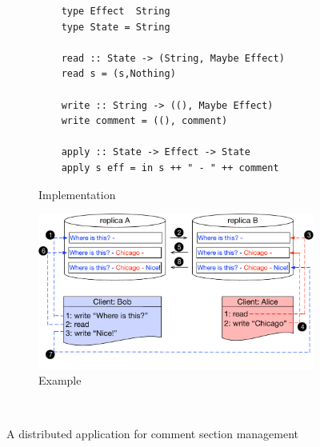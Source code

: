 \begin{figure}[t]
        \centering
	\begin{subfigure}[b]{0.45\textwidth}
	\begin{lstlisting}
	type Effect  String 
	type State = String 

	read :: State -> (String, Maybe Effect)
	read s = (s,Nothing)

	write :: String -> ((), Maybe Effect)
	write comment = ((), comment)

	apply :: State -> Effect -> State 
	apply s eff = in s ++ " - " ++ comment
	\end{lstlisting}
	\caption{Implementation}
	\label{subfig:comment_code}
	\end{subfigure}
	\hfill
	\begin{subfigure}[b]{0.49\textwidth}
	\includegraphics[scale=0.36]{Figures/comment_application.pdf}
	\caption{Example}
	\label{subfig:comment_example}
	\end{subfigure} 
\\ \hrulefill
\caption{A distributed application for comment section
management}
\label{fig:comment_app}
\end{figure}


